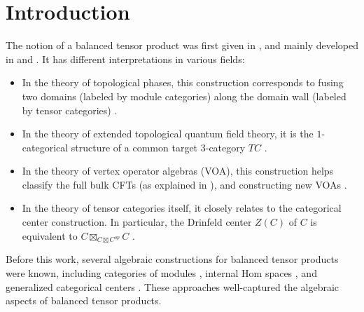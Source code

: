\section{Introduction}



The notion of a balanced tensor product was first given in
\cite{etingof/fusion-cat-and-homotopy}, and mainly developed in
\cite{douglas/balanced-product} and \cite{douglas/dualizable-tensor-categories}.
It has different interpretations in various fields:
\begin{itemize}
  \item In the theory of topological phases, this construction corresponds to
        fusing two domains (labeled by module categories) along the domain
        wall (labeled by tensor categories) \cite{kong/topological-order}.
  \item In the theory of extended topological quantum field theory, it is the
        $1$-categorical structure of a common target $3$-category $TC$
        \cite{douglas/dualizable-tensor-categories}.
  \item In the theory of vertex operator algebras (VOA), this construction helps
        classify the full bulk CFTs (as explained in
        \cite{gannon/exotic-quantum-subgroup}), and constructing new VOAs
        \cite{gannon/sln-II}.
  \item In the theory of tensor categories itself, it closely relates to the
        categorical center construction. In particular, the Drinfeld center
        $Z(C)$ of $C$ is equivalent to $C \boxtimes_{C \boxtimes C^{op}} C$
        \cite{kirillov/string-net-tv}
        \cite{douglas/dualizable-tensor-categories}.
\end{itemize}

Before this work, several algebraic constructions for balanced tensor products
were known, including categories of modules \cite{douglas/balanced-product},
internal Hom spaces \cite{davydov/picard}, and generalized categorical centers
\cite{etingof/fusion-cat-and-homotopy} \cite{kirillov/fact-homo-4d-tqft}
\cite{hoek/master}. These approaches well-captured the algebraic aspects of
balanced tensor products.

